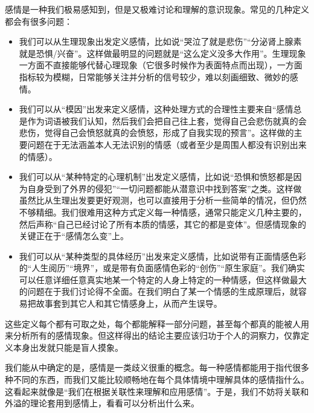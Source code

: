 感情是一种我们极易感知到，但是又极难讨论和理解的意识现象。常见的几种定义都会有很多问题：
\begin{itemize}
\item 我们可以从生理现象出发定义感情，比如说“哭泣了就是悲伤”“分泌肾上腺素就是恐惧/兴奋”。这样做最明显的问题就是“这么定义没多大作用”。生理现象一方面不直接能够代替心理现象（它很多时候作为表面特点而出现），一方面指标较为模糊，日常能够关注并分析的信号较少，难以刻画细致、微妙的感情。
\item 我们可以从“模因”出发来定义感情，这种处理方式的合理性主要来自“感情总是作为词语被我们认知，然后我们会把自己往上套，觉得自己会悲伤就真的会悲伤，觉得自己会愤怒就真的会愤怒，形成了自我实现的预言”。这样做的主要问题在于无法涵盖本人无法识别的情感（或者至少是周围人都没有识别出来的情感）。
\item 我们可以从“某种特定的心理机制”出发定义感情，比如说“恐惧和愤怒都是因为自身受到了外界的侵犯”“一切问题都能从潜意识中找到答案”之类。这样做虽然比从生理出发要更好观测，也可以直接用于分析一些简单的情况，但仍然不够精细。我们很难用这种方式定义每一种情感，通常只能定义几种主要的，然后声称“自己已经讨论了所有本质的情感，其它的都是变体”。但感情现象的关键正在于“感情怎么变”上。
\item 我们可以从“某种类型的具体经历”出发来定义感情，比如说带有正面情感色彩的“人生阅历”“境界”，或是带有负面感情色彩的“创伤”“原生家庭”。我们确实可以任意详细任意真实地某一个特定的人身上特定的一种情感，但这样做最大的问题在于我们讨论得不全面。在我们明白了某一个情感的生成原理后，就容易把故事套到其它人和其它情感身上，从而产生误导。
\end{itemize}
这些定义每个都有可取之处，每个都能解释一部分问题，甚至每个都真的能被人用来分析所有的感情现象。但这样得出的结论主要应该归功于个人的洞察力，仅靠定义本身出发就只能是盲人摸象。

我们能从中确定的是，感情是一类歧义很重的概念。每一种感情都能用于指代很多种不同的东西，而我们又能比较顺畅地在每个具体情境中理解具体的感情指什么。这看起来就像是“我们在根据关联性来理解和应用感情”。于是，我们不妨将关联和外溢的理论套用到感情上，看看可以分析出什么来。

\divider

